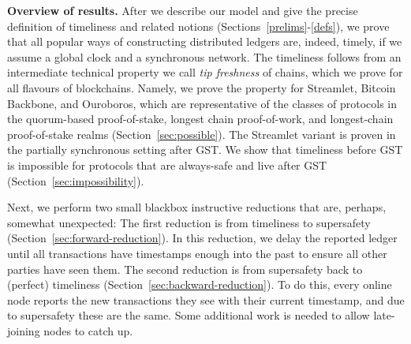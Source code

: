 \noindent
\textbf{Overview of results.}
After we describe our model and give the precise definition
of timeliness and related notions (Sections~\ref{prelims}-\ref{defs}),
we prove that all popular ways of constructing distributed ledgers
are, indeed, timely, if we assume a global clock and a synchronous network.
The timeliness follows from an intermediate technical property we call \emph{tip freshness}
of chains, which we prove for all flavours of blockchains. Namely, we prove the
property for Streamlet, Bitcoin Backbone, and Ouroboros, which are representative
of the classes of protocols in the quorum-based proof-of-stake, longest chain
proof-of-work, and longest-chain proof-of-stake realms (Section~\ref{sec:possible}).
The Streamlet variant is proven in the partially synchronous setting after GST.
We show that timeliness before GST is impossible for protocols that are always-safe
and live after GST (Section~\ref{sec:impossibility}).

Next, we perform two small blackbox instructive reductions that are, perhaps, somewhat unexpected:
The first reduction is from timeliness to supersafety (Section~\ref{sec:forward-reduction}).
In this reduction, we delay the reported ledger until all
transactions have timestamps enough into the past to ensure all other parties have seen them.
The second reduction is from supersafety back to (perfect) timeliness (Section~\ref{sec:backward-reduction}).
To do this, every online node reports the new transactions they see with
their current timestamp, and due to supersafety these are the same.
Some additional work is needed to allow late-joining nodes to catch up.

